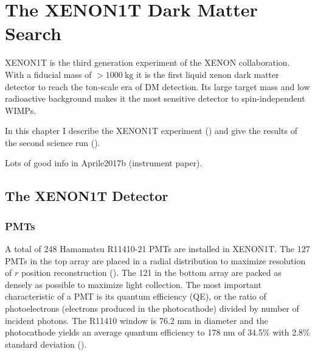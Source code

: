 

\pagestyle{cu}
\graphicspath{{./Chapter3/Figures/}}
\chapter[The XENON1T Dark Matter Search][The XENON1T Dark Matter Search]{The XENON1T Dark Matter Search}



XENON1T is the third generation experiment of the XENON collaboration.  With a fiducial mass of $> 1000\ \mathrm{kg}$ it is the first
liquid xenon dark matter detector to reach the ton-scale era of DM detection.  Its large target mass and low radioactive background
makes it the most sensitive detector to spin-independent WIMPs.

In this chapter I describe the XENON1T experiment () and give the results of the second science run
().

Lots of good info in Aprile2017b (instrument paper).

\section{The XENON1T Detector}
\label{sec:xenon1t_detector}




\subsection{PMTs}
\label{subsec:xenon1t_pmts}
A total of 248 Hamamatsu R11410-21 PMTs are installed in XENON1T.  The 127 PMTs in the top array are placed in a radial distribution to
maximize resolution of $r$ position reconstruction ().  The 121 in the bottom array
are packed as densely as possible to maximize light collection.  The most important characteristic of a PMT is its quantum efficiency
(QE), or the ratio of photoelectrons (electrons produced in the photocathode) divided by number of incident photons.  The R11410 window is
76.2 mm in diameter and the photocathode yields an average quantum efficiency to 178 nm of 34.5\% with 2.8\%
standard deviation ().

